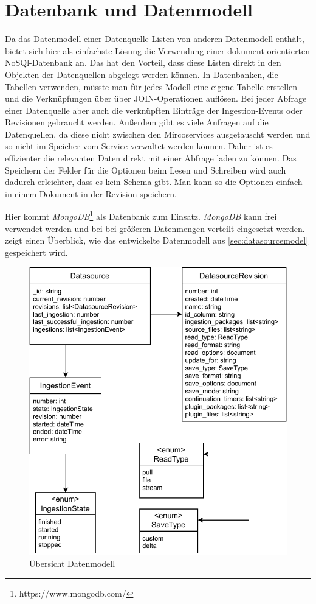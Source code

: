 \section{Datenbank und Datenmodell}

Da das Datenmodell einer Datenquelle Listen von anderen Datenmodell enthält, bietet sich hier als einfachste Lösung die Verwendung einer dokument-orientierten NoSQl-Datenbank an.
Das hat den Vorteil, dass diese Listen direkt in den Objekten der Datenquellen abgelegt werden können.
In Datenbanken, die Tabellen verwenden, müsste man für jedes Modell eine eigene Tabelle erstellen und die Verknüpfungen über über JOIN-Operationen auflösen.
Bei jeder Abfrage einer Datenquelle aber auch die verknüpften Einträge der Ingestion-Events oder Revisionen gebraucht werden.
Außerdem gibt es viele Anfragen auf die Datenquellen, da diese nicht zwischen den Mircoservices ausgetauscht werden und so nicht im Speicher vom Service verwaltet werden können.
Daher ist es effizienter die relevanten Daten direkt mit einer Abfrage laden zu können.
Das Speichern der Felder für die Optionen beim Lesen und Schreiben wird auch dadurch erleichter, dass es kein Schema gibt.
Man kann so die Optionen einfach in einem Dokument in der Revision speichern.

Hier kommt \textit{MongoDB}\footnote{https://www.mongodb.com/} als Datenbank zum Einsatz.
\textit{MongoDB} kann frei verwendet werden und bei bei größeren Datenmengen verteilt eingesetzt werden.
 zeigt einen Überblick, wie das entwickelte Datenmodell aus \ref{sec:datasourcemodel} gespeichert wird.

\begin{figure}
    \centering
    \includegraphics{Grafiken/ingestion-Datamodel.pdf}
    \caption{Übersicht Datenmodell}
    \label{fig:datamodel}
\end{figure}